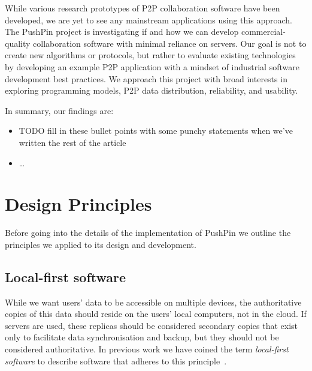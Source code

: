 \documentclass[sigplan,10pt]{acmart}
\begin{document}
While various research prototypes of P2P collaboration software have been developed, we are yet to see any mainstream applications using this approach.
The PushPin project is investigating if and how we can develop commercial-quality collaboration software with minimal reliance on servers.
Our goal is not to create new algorithms or protocols, but rather to evaluate existing technologies by developing an example P2P application with a mindset of industrial software development best practices.
We approach this project with broad interests in exploring programming models, P2P data distribution, reliability, and usability.

In summary, our findings are:
\begin{itemize}
    \item TODO fill in these bullet points with some punchy statements when we've written the rest of the article
    \item \dots
\end{itemize}




\section{Design Principles}\label{sec:principles}

Before going into the details of the implementation of PushPin we outline the principles we applied to its design and development.

\subsection{Local-first software}

While we want users' data to be accessible on multiple devices, the authoritative copies of this data should reside on the users' local computers, not in the cloud.
If servers are used, these replicas should be considered secondary copies that exist only to facilitate data synchronisation and backup, but they should not be considered authoritative.
In previous work we have coined the term \emph{local-first software} to describe software that adheres to this principle~\cite{LocalFirst}.
\end{document}
